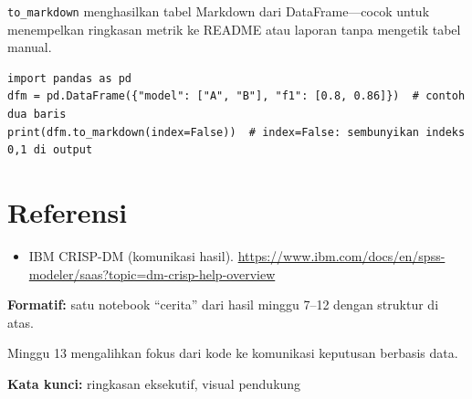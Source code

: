 \documentclass[../main.tex]{subfiles}
\begin{document}
\MulaiPenjelasanKode \texttt{to\_markdown} menghasilkan tabel Markdown dari DataFrame---cocok untuk menempelkan ringkasan metrik ke README atau laporan tanpa mengetik tabel manual. \SelesaiPenjelasanKode

\begin{lstlisting}[caption=Tabel ringkasan metrik ke Markdown via print]
import pandas as pd
dfm = pd.DataFrame({"model": ["A", "B"], "f1": [0.8, 0.86]})  # contoh dua baris
print(dfm.to_markdown(index=False))  # index=False: sembunyikan indeks 0,1 di output
\end{lstlisting}

\section{Referensi}

\begin{itemize}[leftmargin=*]
  \item IBM CRISP-DM (komunikasi hasil). \url{https://www.ibm.com/docs/en/spss-modeler/saas?topic=dm-crisp-help-overview}
\end{itemize}

\begin{asesmen}
\textbf{Formatif:} satu notebook ``cerita'' dari hasil minggu 7--12 dengan struktur di atas.
\end{asesmen}

\begin{rangkuman}
Minggu 13 mengalihkan fokus dari kode ke komunikasi keputusan berbasis data.

\textbf{Kata kunci:} ringkasan eksekutif, visual pendukung
\end{rangkuman}
\end{document}
